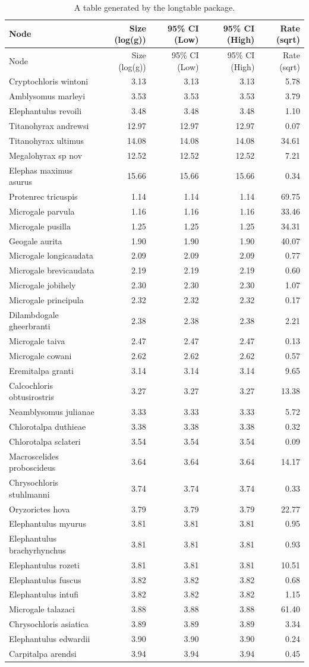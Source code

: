 \documentclass[10pt,letterpaper]{article}
\begin{document}
\begin{longtable}[]{@{}lrrrr@{}}
\caption{A table generated by the longtable package.}\tabularnewline
\toprule
Node & Size (log(g)) & 95\% CI (Low) & 95\% CI (High) & Rate
(sqrt)\tabularnewline
\midrule
\endfirsthead
\toprule
Node & Size (log(g)) & 95\% CI (Low) & 95\% CI (High) & Rate
(sqrt)\tabularnewline
\midrule
\endhead
Cryptochloris wintoni & 3.13 & 3.13 & 3.13 & 5.78\tabularnewline
Amblysomus marleyi & 3.53 & 3.53 & 3.53 & 3.79\tabularnewline
Elephantulus revoili & 3.48 & 3.48 & 3.48 & 1.10\tabularnewline
Titanohyrax andrewsi & 12.97 & 12.97 & 12.97 & 0.07\tabularnewline
Titanohyrax ultimus & 14.08 & 14.08 & 14.08 & 34.61\tabularnewline
Megalohyrax sp nov & 12.52 & 12.52 & 12.52 & 7.21\tabularnewline
Elephas maximus asurus & 15.66 & 15.66 & 15.66 & 0.34\tabularnewline
Protenrec tricuspis & 1.14 & 1.14 & 1.14 & 69.75\tabularnewline
Microgale parvula & 1.16 & 1.16 & 1.16 & 33.46\tabularnewline
Microgale pusilla & 1.25 & 1.25 & 1.25 & 34.31\tabularnewline
Geogale aurita & 1.90 & 1.90 & 1.90 & 40.07\tabularnewline
Microgale longicaudata & 2.09 & 2.09 & 2.09 & 0.77\tabularnewline
Microgale brevicaudata & 2.19 & 2.19 & 2.19 & 0.60\tabularnewline
Microgale jobihely & 2.30 & 2.30 & 2.30 & 1.07\tabularnewline
Microgale principula & 2.32 & 2.32 & 2.32 & 0.17\tabularnewline
Dilambdogale gheerbranti & 2.38 & 2.38 & 2.38 & 2.21\tabularnewline
Microgale taiva & 2.47 & 2.47 & 2.47 & 0.13\tabularnewline
Microgale cowani & 2.62 & 2.62 & 2.62 & 0.57\tabularnewline
Eremitalpa granti & 3.14 & 3.14 & 3.14 & 9.65\tabularnewline
Calcochloris obtusirostris & 3.27 & 3.27 & 3.27 & 13.38\tabularnewline
Neamblysomus julianae & 3.33 & 3.33 & 3.33 & 5.72\tabularnewline
Chlorotalpa duthieae & 3.38 & 3.38 & 3.38 & 0.32\tabularnewline
Chlorotalpa sclateri & 3.54 & 3.54 & 3.54 & 0.09\tabularnewline
Macroscelides proboscideus & 3.64 & 3.64 & 3.64 & 14.17\tabularnewline
Chrysochloris stuhlmanni & 3.74 & 3.74 & 3.74 & 0.33\tabularnewline
Oryzorictes hova & 3.79 & 3.79 & 3.79 & 22.77\tabularnewline
Elephantulus myurus & 3.81 & 3.81 & 3.81 & 0.95\tabularnewline
Elephantulus brachyrhynchus & 3.81 & 3.81 & 3.81 & 0.93\tabularnewline
Elephantulus rozeti & 3.81 & 3.81 & 3.81 & 10.51\tabularnewline
Elephantulus fuscus & 3.82 & 3.82 & 3.82 & 0.68\tabularnewline
Elephantulus intufi & 3.82 & 3.82 & 3.82 & 1.15\tabularnewline
Microgale talazaci & 3.88 & 3.88 & 3.88 & 61.40\tabularnewline
Chrysochloris asiatica & 3.89 & 3.89 & 3.89 & 3.34\tabularnewline
Elephantulus edwardii & 3.90 & 3.90 & 3.90 & 0.24\tabularnewline
Carpitalpa arendsi & 3.94 & 3.94 & 3.94 & 0.45\tabularnewline

\end{longtable}
\end{document}
